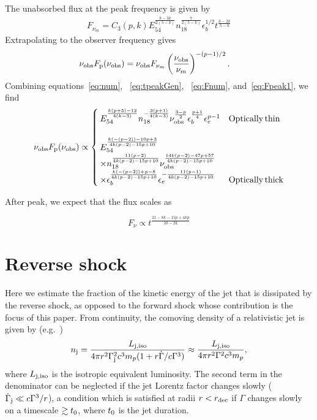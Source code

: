 \documentclass[usenatbib,fleqn]{mnras}
\begin{document}
The unabsorbed flux at the peak frequency is given by
\begin{align}
  F_{\nu_m} =  C_3(p, k) E_{54}^{\frac{8-3 k}{2 (5-k)}}
  n_{18}^{\frac{7}{2 (5-k)}} \epsilon_b^{1/2} t^{\frac{3-2 k}{5-k}}
\label{eq:Fnum}
\end{align}
%
Extrapolating to the observer frequency gives 
\begin{align}
  \nu_{\rm obs} F_{\rm p} (\nu_{\rm obs}) &= \nu_{\rm obs}   F_{\nu_m}
  \left(\frac{\nu_{\rm obs}}{\nu_m}\right)^{-(p-1)/2}.
  \label{eq:Fpeak1}
\end{align}
%
Combining equations~\eqref{eq:num}, ~\eqref{eq:tpeakGen}, ~\eqref{eq:Fnum},
and~\eqref{eq:Fpeak1}, we find
\begin{align}
  \nu_{\rm obs} F_{\rm p} (\nu_{\rm obs}) \propto
  \begin{cases}
    E_{54}^{\frac{k (p+5)-12}{4 (k-3)}} n_{18}^{-\frac{3 (p+1)}{4
        (k-3)}} \nu_{\rm obs}^{\frac{3-p}{2}}
    \epsilon_b^{\frac{p+1}{4}} \epsilon_e^{p-1} & {\rm Optically\, thin}\\\\
    E_{54}^{\frac{k(-(p-2))-10 p+3}{4 k (p-2)-15 p+10}} \\ \times
    n_{18}^{\frac{11 (p-2)}{4 k (p-2)-15 p+10}} \nu_{\rm
      obs}^{\frac{14 k (p-2)-47 p+57}{4 k (p-2)-15 p+10}} \\ \times
    \epsilon_b^{\frac{k (-(p-2))+p-8}{4 k(p-2)-15 p+10}}
    \epsilon_e^{-\frac{11 (p-1)}{4 k (p-2)-15p+10}} & {\rm Optically\,
    thick}
  \end{cases}
  \label{eq:peakLumGen}
\end{align}

After peak, we expect that the flux scales as 

\begin{equation}
F_{\nu}\propto t^{\frac{21-8k-15p+4kp}{10-2k}}
\label{eq:tslope}
\end{equation}



\section{Reverse shock}
\label{sec:reverse}
Here we estimate the fraction of the kinetic energy of the jet that is
dissipated by the reverse shock, as opposed to the forward shock whose
contribution is the focus of this paper.  From continuity, the
comoving density of a relativistic jet is given by
(e.g.~\citealt{Beloborodov&Uhm2006})
 \begin{align}
   n_{\rm j} =  \frac{L_{\rm j, iso}}{4 \pi r^{2}\Gamma_{\rm
       j}^{2}c^{3}m_p(1 + r \dot{\Gamma}/c\Gamma^{3})}
   \approx  \frac{L_{\rm j, iso}}{4 \pi r^{2}\Gamma^{2}c^{3}m_p},
\end{align}
%
where $L_{\rm j, iso}$ is the isotropic equivalent luminosity.  The
second term in the denominator can be neglected if the jet Lorentz
factor changes slowly ($\dot{\Gamma}_{\rm j} \ll c\Gamma^{3}/r$), a
condition which is satisfied at radii $r < r_{\rm dec}$ if $\Gamma$
changes slowly on a timescale $\gtrsim t_{\rm 0}$, where $t_{\rm 0}$
is the jet duration.
\end{document}
